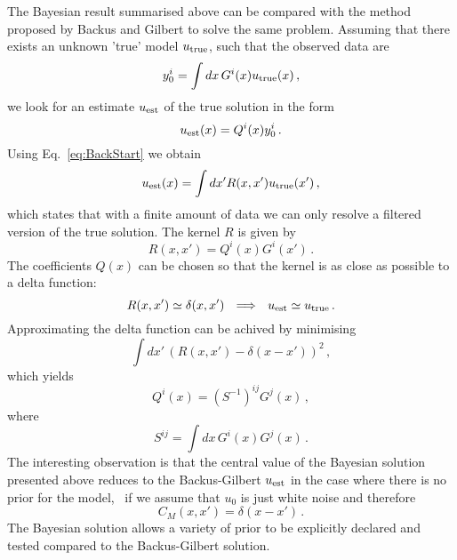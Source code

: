 The Bayesian result summarised above can be compared with the method proposed by Backus and Gilbert 
to solve the same problem. Assuming that there exists an unknown 'true' model $u_\mathrm{true}$, such that 
the observed data are
\begin{equation}
  \label{eq:BackStart}
  y_0^i = \int dx\, G^i(x) u_\mathrm{true}(x)\, ,
\end{equation}
we look for an estimate $u_\mathrm{est}$ of the true solution in the form
\begin{equation}
  \label{eq:BackAnsatz}
  u_\mathrm{est}(x) = Q^i(x) y^i_0\, .
\end{equation}
Using Eq.~\ref{eq:BackStart} we obtain
\begin{equation}
  \label{eq:BackFilter}
  u_\mathrm{est}(x) = \int dx' R(x,x') u_\mathrm{true}(x')\, , 
\end{equation}
which states that with a finite amount of data we can only resolve a filtered
version of the true solution. The kernel $R$ is given by
\begin{equation}
  \label{eq:BackKernel}
  R(x,x') = Q^i(x) G^i(x')\, .
\end{equation}
The coefficients $Q(x)$ can be chosen so that the kernel is as close as possible
to a delta function:
\begin{equation}
  \label{eq:BackDelta}
  R(x,x') \simeq \delta(x,x') ~~ \Longrightarrow ~~
  u_\mathrm{est} \simeq u_\mathrm{true}\, .
\end{equation}
Approximating the delta function can be achived by minimising 
\begin{equation}
  \label{eq:BackDeltaness}
  \int dx'\, \left(
    R(x,x') - \delta(x-x')
  \right)^2\, ,
\end{equation}
which yields
\begin{equation}
  \label{eq:BackSolution}
  Q^i(x) = \left(S^{-1}\right)^{ij} G^j(x)\, ,
\end{equation}
where 
\begin{equation}
  \label{eq:BackSMatrix}
  S^{ij} = \int dx\, G^i(x) G^j(x)\, .
\end{equation}
The interesting observation is that the central value of the Bayesian solution
presented above reduces to the Backus-Gilbert $u_\mathrm{est}$ in the case where there is
no prior for the model, \ie\ if we assume that $u_0$ is just white noise and
therefore
\begin{equation}
  \label{eq:BackComparison}
  C_M(x,x') = \delta(x-x')\, .
\end{equation}
The Bayesian solution allows a variety of prior to be explicitly declared and
tested compared to the Backus-Gilbert solution. 